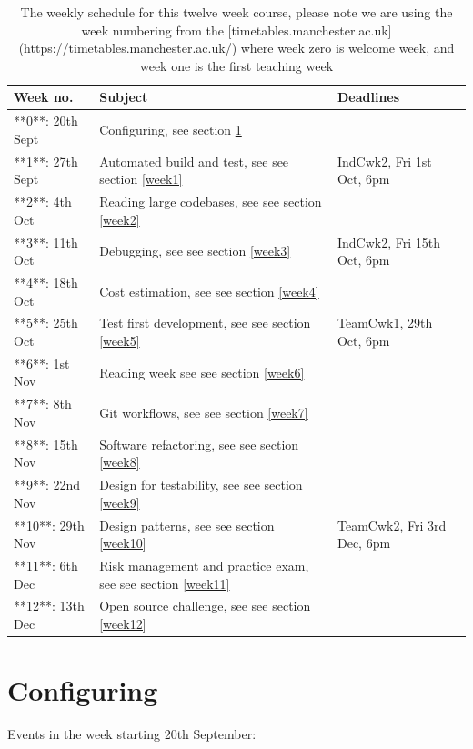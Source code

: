 \documentclass[
]{book}
\begin{document}
\begin{table}

\caption{\label{tab:schedtable}The weekly schedule for this twelve week course, please note we are using the week numbering from the [timetables.manchester.ac.uk](https://timetables.manchester.ac.uk/) where week zero is welcome week, and week one is the first teaching week}
\centering
\begin{tabular}[t]{lll}
\toprule
Week no. & Subject & Deadlines\\
\midrule
**0**: 20th Sept & Configuring, see section \ref{week0} & \\
**1**: 27th Sept & Automated build and test, see see section \ref{week1} & IndCwk2, Fri 1st Oct, 6pm\\
**2**: 4th Oct & Reading large codebases, see see section \ref{week2} & \\
**3**: 11th Oct & Debugging, see see section \ref{week3} & IndCwk2, Fri 15th Oct, 6pm\\
**4**: 18th Oct & Cost estimation, see see section \ref{week4} & \\
\addlinespace
**5**: 25th Oct & Test first development, see see section \ref{week5} & TeamCwk1, 29th Oct, 6pm\\
**6**: 1st Nov & Reading week see see section \ref{week6} & \\
**7**: 8th Nov & Git workflows, see see section \ref{week7} & \\
**8**: 15th Nov & Software refactoring, see see section \ref{week8} & \\
**9**: 22nd Nov & Design for testability, see see section \ref{week9} & \\
\addlinespace
**10**: 29th Nov & Design patterns, see see section \ref{week10} & TeamCwk2, Fri 3rd Dec, 6pm\\
**11**: 6th Dec & Risk management and practice exam, see see section \ref{week11} & \\
**12**: 13th Dec & Open source challenge, see see section \ref{week12} & \\
\bottomrule
\end{tabular}
\end{table}

\hypertarget{week0}{%
\section{Configuring}\label{week0}}

Events in the week starting 20th September:
\end{document}
